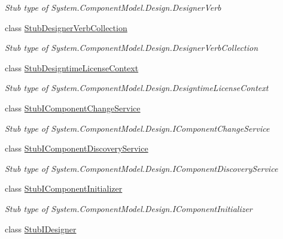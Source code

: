 \begin{DoxyCompactItemize}
\begin{DoxyCompactList}\small\item\em Stub type of System.\-Component\-Model.\-Design.\-Designer\-Verb\end{DoxyCompactList}\item 
class \hyperlink{class_system_1_1_component_model_1_1_design_1_1_fakes_1_1_stub_designer_verb_collection}{Stub\-Designer\-Verb\-Collection}
\begin{DoxyCompactList}\small\item\em Stub type of System.\-Component\-Model.\-Design.\-Designer\-Verb\-Collection\end{DoxyCompactList}\item 
class \hyperlink{class_system_1_1_component_model_1_1_design_1_1_fakes_1_1_stub_designtime_license_context}{Stub\-Designtime\-License\-Context}
\begin{DoxyCompactList}\small\item\em Stub type of System.\-Component\-Model.\-Design.\-Designtime\-License\-Context\end{DoxyCompactList}\item 
class \hyperlink{class_system_1_1_component_model_1_1_design_1_1_fakes_1_1_stub_i_component_change_service}{Stub\-I\-Component\-Change\-Service}
\begin{DoxyCompactList}\small\item\em Stub type of System.\-Component\-Model.\-Design.\-I\-Component\-Change\-Service\end{DoxyCompactList}\item 
class \hyperlink{class_system_1_1_component_model_1_1_design_1_1_fakes_1_1_stub_i_component_discovery_service}{Stub\-I\-Component\-Discovery\-Service}
\begin{DoxyCompactList}\small\item\em Stub type of System.\-Component\-Model.\-Design.\-I\-Component\-Discovery\-Service\end{DoxyCompactList}\item 
class \hyperlink{class_system_1_1_component_model_1_1_design_1_1_fakes_1_1_stub_i_component_initializer}{Stub\-I\-Component\-Initializer}
\begin{DoxyCompactList}\small\item\em Stub type of System.\-Component\-Model.\-Design.\-I\-Component\-Initializer\end{DoxyCompactList}\item 
class \hyperlink{class_system_1_1_component_model_1_1_design_1_1_fakes_1_1_stub_i_designer}{Stub\-I\-Designer}

\end{DoxyCompactItemize}

